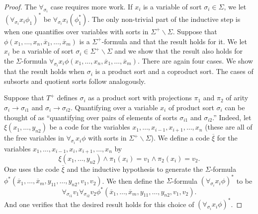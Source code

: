 \begin{proof}
The $\forall_{\sigma_i}$ case requires more work. If $x_i$ is a
variable of sort $\sigma_i\in\Sigma$, we let
$(\forall_{\sigma_i} x_i \phi_1)^*$ be
$\forall_{\sigma_i} x_i (\phi_1^*)$. The only non-trivial part of the
inductive step is when one quantifies over variables with sorts in
$\Sigma^+\backslash\Sigma$. Suppose that
$\phi(x_1,\ldots, x_n, \overline{x}_1,\ldots, \overline{x}_m)$ is a
$\Sigma^+$-formula and that the result holds for it. We let $x_i$ be a
variable of sort $\sigma_i\in\Sigma^+\backslash\Sigma$ and we show
that the result also holds for the $\Sigma$-formula
$\forall_{\sigma_i}x_i\phi(x_1,\ldots, x_n, \overline{x}_1,\ldots,
\overline{x}_m)$. There are again four cases. We show that the result
holds when $\sigma_i$ is a product sort and a coproduct sort. The
cases of subsorts and quotient sorts follow analogously.

Suppose that $T^+$ defines $\sigma_i$ as a product sort with
projections $\pi_1$ and $\pi_2$ of arity
$\sigma_i\rightarrow\sigma_{i1}$ and $\sigma_i\rightarrow\sigma_{i2}$.
Quantifying over a variable $x_i$ of product sort $\sigma_i$ can be
thought of as ``quantifying over pairs of elements of sorts
$\sigma_{i1}$ and $\sigma_{i2}$.''  Indeed, let
$\xi(x_1,\ldots, y_{n2})$ be a code for the variables
$x_1,\ldots, x_{i-1}, x_{i+1}, \ldots, x_n$ (these are all of the free
variables in $\forall_{\sigma_i}x_i\phi$ with sorts in
$\Sigma^+\backslash\Sigma$). We define a code $\overline{\xi}$ for the
variables $x_1,\ldots, x_{i-1}, x_i, x_{i+1}, \ldots, x_n$ by
\[ \xi(x_1,\ldots, y_{n2})\land\pi_1(x_i)=v_1\land\pi_2(x_i)=v_2 .\]
One uses the code $\overline{\xi}$ and the inductive hypothesis to
generate the $\Sigma$-formula
$\phi^*(\overline{x}_1,\ldots, \overline{x}_m, y_{11},\ldots, y_{n2},
v_1, v_2)$. We then define the $\Sigma$-formula
$(\forall_{\sigma_i}x_i\phi)^*$ to be
\[ \forall_{\sigma_{i1}}
  v_1\forall_{\sigma_{i2}}v_2\phi^*(\overline{x}_1,\ldots,
  \overline{x}_m, y_{11},\ldots, y_{n2}, v_1, v_2) .\]
And one verifies that the desired result holds for this choice of
$(\forall_{\sigma_i}x_i\phi)^*$.


\end{proof}
